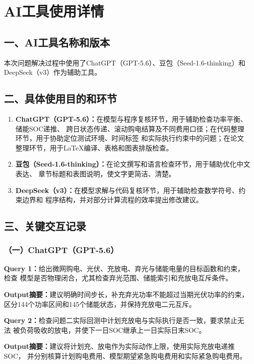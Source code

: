 \section*{AI工具使用详情}

\subsection*{一、AI工具名称和版本}
本次问题解决过程中使用了ChatGPT（GPT-5.6）、豆包（Seed-1.6-thinking）和
DeepSeek（v3）作为辅助工具。

\subsection*{二、具体使用目的和环节}
\begin{enumerate}[label=（\arabic*）]
  \item \textbf{ChatGPT（GPT-5.6）：}在模型与程序复核环节，用于辅助检查功率平衡、储能SOC递推、
  跨日状态传递、滚动购电结算及不同费用口径；在代码整理环节，用于协助定位测试环境、时间标签
  和实际执行约束中的问题；在论文整理环节，用于LaTeX编译、表格和图表排版检查。
  \item \textbf{豆包（Seed-1.6-thinking）：}在论文撰写和语言检查环节，用于辅助优化中文表达、
  章节标题和表图说明，使文字更简洁、清楚。
  \item \textbf{DeepSeek（v3）：}在模型求解与代码复核环节，用于辅助检查数学符号、约束边界和
  程序结构，并对部分计算流程的效率提出修改建议。
\end{enumerate}

\subsection*{三、关键交互记录}
\subsubsection*{（一）ChatGPT（GPT-5.6）}
\noindent\textbf{Query 1：}给出微网购电、光伏、充放电、弃光与储能电量的目标函数和约束，检查
模型是否物理闭合，尤其检查弃光范围、储能索引和充放电互斥条件。

\noindent\textbf{Output摘要：}建议明确时间步长，补充弃光功率不能超过当期光伏功率的约束，
区分144个功率区间和145个储能状态，并保持充放电二元互斥。

\noindent\textbf{Query 2：}检查问题二实际回测中计划充放电与实际执行是否一致，要求禁止无法
被负荷吸收的放电，并使下一日SOC继承上一日实际日末SOC。

\noindent\textbf{Output摘要：}建议将计划充、放电作为实际动作上限，使用实际充放电递推SOC，
并分别核算计划购电费用、模型期望紧急购电费用和实际紧急购电费用。

